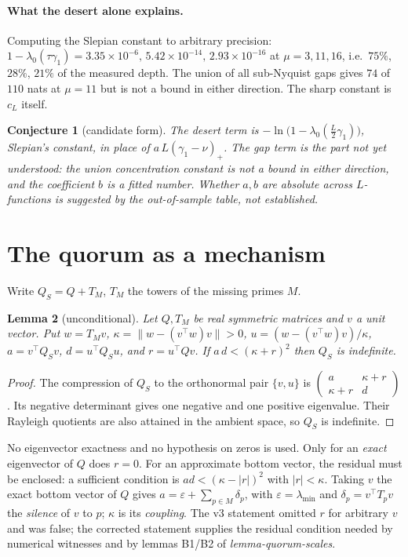 \documentclass[11pt]{article}
\newtheorem{lemma}{Lemma}\newtheorem{conjecture}[lemma]{Conjecture}
\begin{document}
\paragraph{What the desert alone explains.} Computing the Slepian constant to arbitrary precision: $1-\lambda_0(\tau\gamma_1)=3.35\times10^{-6},\,5.42\times10^{-14},\,2.93\times10^{-16}$ at $\mu=3,11,16$, i.e.\ $75\%$, $28\%$, $21\%$ of the measured depth. The union of all sub-Nyquist gaps gives $74$ of $110$ nats at $\mu=11$ but is not a bound in either direction. The sharp constant is $c_L$ itself.

\begin{conjecture}[candidate form]
The desert term is $-\ln\bigl(1-\lambda_0(\tfrac L2\gamma_1)\bigr)$, Slepian's constant, in place of $a\,L(\gamma_1-\nu)_+$. The gap term is the part not yet understood: the union concentration constant is not a bound in either direction, and the coefficient $b$ is a fitted number. Whether $a,b$ are absolute across $L$-functions is suggested by the out-of-sample table, not established.
\end{conjecture}

\section{The quorum as a mechanism}
Write $Q_S=Q+T_M$, $T_M$ the towers of the missing primes $M$.
\begin{lemma}[unconditional]
Let $Q,T_M$ be real symmetric matrices and $v$ a unit vector. Put $w=T_Mv$, $\kappa=\|w-(v^{\!\top}w)v\|>0$, $u=(w-(v^{\!\top}w)v)/\kappa$, $a=v^{\!\top}Q_Sv$, $d=u^{\!\top}Q_Su$, and $r=u^{\!\top}Qv$. If $a\,d<(\kappa+r)^2$ then $Q_S$ is indefinite.
\end{lemma}
\begin{proof} The compression of $Q_S$ to the orthonormal pair $\{v,u\}$ is $\begin{pmatrix}a&\kappa+r\\\kappa+r&d\end{pmatrix}$. Its negative determinant gives one negative and one positive eigenvalue. Their Rayleigh quotients are also attained in the ambient space, so $Q_S$ is indefinite. \end{proof}
No eigenvector exactness and no hypothesis on zeros is used. Only for an \emph{exact} eigenvector of $Q$ does $r=0$. For an approximate bottom vector, the residual must be enclosed: a sufficient condition is $a d<(\kappa-|r|)^2$ with $|r|<\kappa$. Taking $v$ the exact bottom vector of $Q$ gives $a=\varepsilon+\sum_{p\in M}\delta_p$, with $\varepsilon=\lambda_{\min}$ and $\delta_p=v^{\!\top}T_pv$ the \emph{silence} of $v$ to $p$; $\kappa$ is its \emph{coupling}. The v3 statement omitted $r$ for arbitrary $v$ and was false; the corrected statement supplies the residual condition needed by numerical witnesses and by lemmas B1/B2 of \emph{lemma-quorum-scales}.
\end{document}
